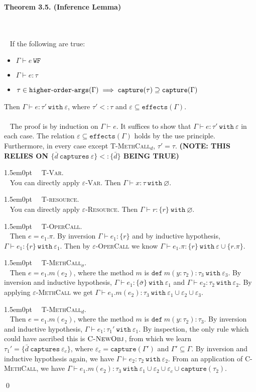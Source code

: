 \documentclass{llncs}
\newcommand{\keywadj}[1]{\mathtt{#1}}
\newcommand{\keyw}[1]{\keywadj{#1}~}
\newcommand{\kw}[1]{\keyw{ #1 }}
\newcommand{\kwa}[1]{\keywadj{ #1 }}
\newcommand{\hyphen}{\hbox{-}}
\newcommand{\thm}[3]{
	\begin{large}
		\bf{#1}
	\end{large} \\\\
	\fbox{Statement.} ~ #2
	\fbox{Proof.}~ #3 \qed
}
\newcommand{\proofcase}[2]{
	\begin{adjustwidth}{1.5em}{0pt}
		\fbox{Case.}~~#1. \\ ~#2
	\end{adjustwidth}
}
\begin{document}
\thm{Theorem 3.5. (Inference Lemma)}
{If the following are true:

\begin{itemize}
	\item $\Gamma \vdash e~\kwa{WF}$
	\item $\Gamma \vdash e : \tau$
	\item $\tau \in \kwa{higher \hyphen order \hyphen args}(\Gamma) \implies \kwa{capture}(\tau) \supseteq \kwa{capture}(\Gamma)$
\end{itemize}

\noindent
Then $\Gamma \vdash e : \tau'~\kw{with} \varepsilon$, where $\tau' <: \tau$ and $\varepsilon \subseteq \kwa{effects}(\Gamma)$.\\\\}
{The proof is by induction on $\Gamma \vdash e$. It suffices to show that $\Gamma \vdash e : \tau'~\kw{with} \varepsilon$ in each case. The relation $\varepsilon \subseteq \kwa{effects}(\Gamma)$ holds by the use principle. Furthermore, in every case except \textsc{T-MethCall$_d$}, $\tau' = \tau$. \textbf{(NOTE: THIS RELIES ON $\{ \bar d~\kw{captures} \varepsilon \} <: \{ \bar d \}$ BEING TRUE)}\\

\proofcase{\textsc{T-Var}}{
You can directly apply \textsc{$\varepsilon$-Var}. Then $\Gamma \vdash x : \tau~\kw{with} \varnothing$.
}

\proofcase{\textsc{T-resource}}{
You can directly apply \textsc{$\varepsilon$-Resource}. Then $\Gamma \vdash r : \{ r \}~\kw{with} \varnothing$.
}

\proofcase{\textsc{T-OperCall}}{ Then $e = e_1.\pi$.
By inversion $\Gamma \vdash e_1 : \{ r \}$ and by inductive hypothesis, $\Gamma \vdash e_1 : \{ r \}~\kw{with} \varepsilon_1$. Then by \textsc{$\varepsilon$-OperCall} we know $\Gamma \vdash e_1.\pi : \{ r \}~\kw{with} \varepsilon \cup \{ r.\pi \}$.
}

\proofcase{\textsc{T-MethCall$_\sigma$}}{
Then $e = e_1.m(e_2)$, where the method $m$ is $\kw{def} m(y: \tau_2): \tau_3~\kw{with} \varepsilon_3$. By inversion and inductive hypothesis, $\Gamma \vdash e_1 : \{ \bar \sigma \}~\kw{with} \varepsilon_1$ and $\Gamma \vdash e_2 : \tau_2~\kw{with} \varepsilon_2$. By applying \textsc{$\varepsilon$-MethCall} we get $\Gamma \vdash e_1.m(e_2) : \tau_3~\kw{with} \varepsilon_1 \cup \varepsilon_2 \cup \varepsilon_3$.
}

\proofcase{\textsc{T-MethCall$_d$}}{
Then $e = e_1.m(e_2)$, where the method $m$ is $\kw{def} m(y: \tau_2): \tau_3$. By inversion and inductive hypothesis, $\Gamma \vdash e_1 : \tau_1'~\kw{with} \varepsilon_1$. By inspection, the only rule which could have ascribed this is $\textsc{C-NewObj}$, from which we learn $\tau_1' = \{ \bar d ~ \kw{captures} \varepsilon_c \}$, where $\varepsilon_c = \kwa{capture}(\Gamma')$ and $\Gamma' \subseteq \Gamma$. By inversion and inductive hypothesis again, we have $\Gamma \vdash e_2 : \tau_2~\kw{with} \varepsilon_2$. From an application of \textsc{C-MethCall}, we have $\Gamma \vdash e_1.m(e_2) : \tau_3~\kw{with} \varepsilon_1 \cup \varepsilon_2 \cup \varepsilon_c \cup \kwa{capture}(\tau_2)$.
}

}
\end{document}
